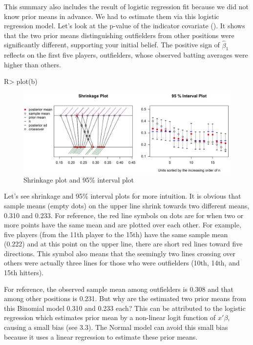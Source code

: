 \documentclass[article]{jss}
\begin{document}
This summary also includes the result of logistic regression fit because we did not know prior means in advance. We had to estimate them via this logistic regression model. Let's look at the p-value of the indicator covariate (). It shows that the two prior means distinguishing outfielders from other positions were significantly different, supporting your initial belief. The positive sign of $\hat{\beta}_{1}$ reflects on the first five players, outfielders, whose observed batting averages were higher than others.
\\
\begin{CodeChunk}
\begin{CodeInput}
R> plot(b)
\end{CodeInput}
\end{CodeChunk}
\begin{figure}[h]
\begin{center}
\includegraphics[scale=0.3]{baseball1.png}
\caption{Shrinkage plot and 95\% interval plot}
\end{center}
\end{figure}

Let's see shrinkage and 95\% interval plots for more intuition. It is obvious that sample means (empty dots) on the upper line shrink towards two different means, 0.310 and 0.233. For reference, the red line symbols on dots are for when two or more points have the same mean and are plotted over each other. For example, five players (from the 11th player to the 15th) have the same sample mean (0.222) and at this point on the upper line, there are short red lines toward five directions. This symbol also means that the seemingly two lines crossing over others were actually three lines for those who were outfielders (10th, 14th, and 15th hitters).


For reference, the observed sample mean among outfielders is 0.308 and that among other positions is 0.231. But why are the estimated two prior means from this Binomial model 0.310 and 0.233 each? This can be attributed to the logistic regression which estimates prior mean by a non-linear logit function of $x'\beta$, causing a small bias (see 3.3). The Normal model can avoid this small bias because it uses a linear regression to estimate these prior means.
\end{document}
